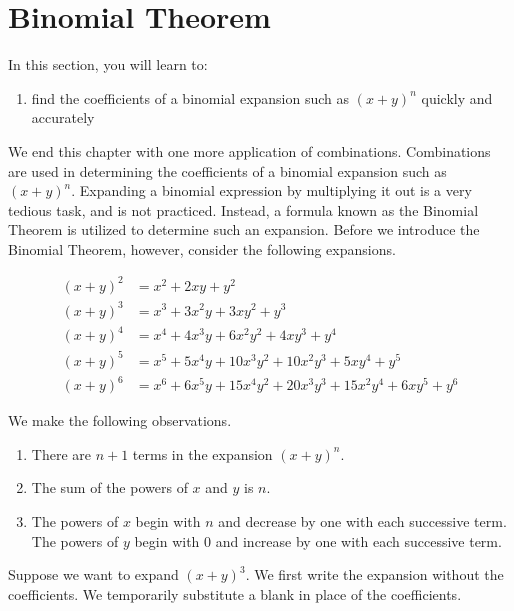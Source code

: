\section{Binomial Theorem}

In this section, you will learn to:
\begin{enumerate}
    \item find the coefficients of a binomial expansion such as \((x+y)^n\) quickly and accurately
\end{enumerate}

We end this chapter with one more application of combinations. Combinations are used in determining the coefficients of a binomial expansion such as $(x + y)^n$.  Expanding a binomial expression by multiplying it out is a very tedious task, and is not practiced. Instead, a formula known as the Binomial Theorem is utilized to determine such an expansion. Before we introduce the Binomial Theorem, however, consider the following expansions.


\begin{align*}
    (x+y)^2 & = x^2 + 2xy + y^2                                            \\
    (x+y)^3 & = x^3 + 3x^2y + 3xy^2 + y^3                                  \\
    (x+y)^4 & = x^4 + 4x^3y + 6x^2y^2 + 4xy^3 + y^4                        \\
    (x+y)^5 & = x^5 + 5x^4y + 10x^3y^2 + 10x^2y^3 + 5xy^4 + y^5            \\
    (x+y)^6 & = x^6 + 6x^5y + 15x^4y^2 + 20x^3y^3 + 15x^2y^4 + 6xy^5 + y^6
\end{align*}

We make the following observations.

\begin{enumerate}
    \item There are \( n + 1 \) terms in the expansion \( (x + y)^n \).
    \item The sum of the powers of \( x \) and \( y \) is \( n \).
    \item The powers of \( x \) begin with \( n \) and decrease by one with each successive term. The powers of \( y \) begin with \( 0 \) and increase by one with each successive term.
\end{enumerate}

Suppose we want to expand \( (x + y)^3 \). We first write the expansion without the coefficients. We temporarily substitute a blank in place of the coefficients.


